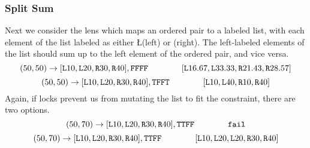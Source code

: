 \documentclass{article}
\begin{document}
\subsubsection{Split Sum}

Next we consider the lens which maps an ordered pair to
a labeled list, with each element of the list labeled 
as either \L (left) or \R (right). The left-labeled
elements of the list should sum up to the left element
of the ordered pair, and vice versa. 
\[ (50,50) \rightarrow [\texttt L10,\texttt L20,\texttt R30,\texttt R40], \texttt F\texttt F\texttt F\texttt F \qquad \qquad [\texttt L16.67,\texttt L33.33,\texttt R21.43,\texttt R28.57] \]
\[ (50,50) \rightarrow [\texttt L10,\texttt L20,\texttt R30,\texttt R40], \texttt T\texttt F\texttt F\texttt T \qquad \qquad [\texttt L10,\texttt L40,\texttt R10,\texttt R40] \]
Again, if locks prevent us from mutating the list to fit the constraint, 
there are two options.
\[ (50,70) \rightarrow [\texttt L10,\texttt L20,\texttt R30,\texttt R40], \texttt T\texttt T\texttt F\texttt F \qquad \qquad \texttt{fail} \]
\[ (50,70) \rightarrow [\texttt L10,\texttt L20,\texttt R30,\texttt R40], \texttt T\texttt T\texttt F\texttt F \qquad \qquad [\texttt L10,\texttt L20,\texttt L20,\texttt R30,\texttt R40] \]
\end{document}
